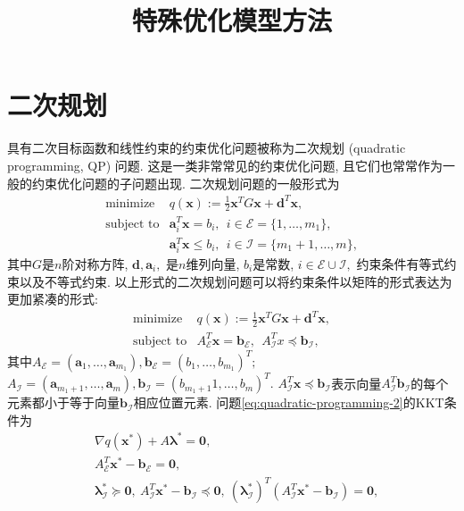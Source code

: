 \documentclass{SBCbookchapter}
\author{}
\title{特殊优化模型方法}
\newcommand{\V}[1]{{\bm{#1}}}
\numberwithin{equation}{section}
\begin{document}
\maketitle


\section{二次规划}
\label{sec:7.2}


具有二次目标函数和线性约束的约束优化问题被称为二次规划 (quadratic programming, QP) 问题. 这是一类非常常见的约束优化问题, 且它们也常常作为一般的约束优化问题的子问题出现. 二次规划问题的一般形式为
\begin{equation}
\label{eq:quadratic-programming-1}
\begin{array}{cl}
\text{minimize} & q(\V{x}) := \frac{1}{2} \V{x}^T G \V{x} + \V{d}^T \V{x}, \\
\text{subject to} & \V{a}_i^T \V{x} = b_i, ~~ i \in \mathcal{E} = \{1, \ldots, m_1\}, \\
& \V{a}_i^T \V{x} \leqslant b_i, ~~ i \in \mathcal{I} = \{m_1 + 1, \ldots, m\},
\end{array}
\end{equation}
其中$G$是$n$阶对称方阵, $\V{d}, \V{a}_i,$ 是$n$维列向量, $b_i$是常数, $i \in \mathcal{E} \cup \mathcal{I},$ 约束条件有等式约束以及不等式约束. 以上形式的二次规划问题可以将约束条件以矩阵的形式表达为更加紧凑的形式:
\begin{equation}
\label{eq:quadratic-programming-2}
\begin{array}{cl}
\text{minimize} & q(\V{x}) := \frac{1}{2} \V{x}^T G \V{x} + \V{d}^T \V{x}, \\
\text{subject to} & A^T_{\mathcal{E}} \V{x} = \V{b}_{\mathcal{E}}, ~~ A^T_{\mathcal{I}} x \preccurlyeq \V{b}_{\mathcal{I}},
\end{array}
\end{equation}
其中$A_{\mathcal{E}} = (\V{a}_1, \ldots, \V{a}_{m_1}), \V{b}_{\mathcal{E}} = (b_1, \ldots, b_{m_1})^T;$ $A_{\mathcal{I}} = (\V{a}_{m_1+1}, \ldots, \V{a}_m), \V{b}_{\mathcal{I}} = (b_{m_1+1}1, \ldots, b_m)^T.$ $A^T_{\mathcal{I}} \V{x} \preccurlyeq \V{b}_{\mathcal{I}}$表示向量$A^T_{\mathcal{I}} \V{b}_{\mathcal{I}}$的每个元素都小于等于向量$\V{b}_{\mathcal{I}}$相应位置元素. 问题\eqref{eq:quadratic-programming-2}的KKT条件为
\begin{equation}
\label{eq:quadratic-programming-kkt}
\begin{aligned}
& \nabla q(\V{x}^*) + A \V{\lambda}^* = \V{0}, \\
& A^T_{\mathcal{E}} \V{x}^* - \V{b}_{\mathcal{E}} = \V{0}, \\
& \V{\lambda}^*_{\mathcal{I}} \succcurlyeq \V{0}, ~ A_{\mathcal{I}}^T \V{x}^* - \V{b}_{\mathcal{I}} \preccurlyeq \V{0}, ~ (\V{\lambda}^*_{\mathcal{I}})^T (A_{\mathcal{I}}^T \V{x}^* - \V{b}_{\mathcal{I}}) = \V{0},
\end{aligned}
\end{equation}
\end{document}
